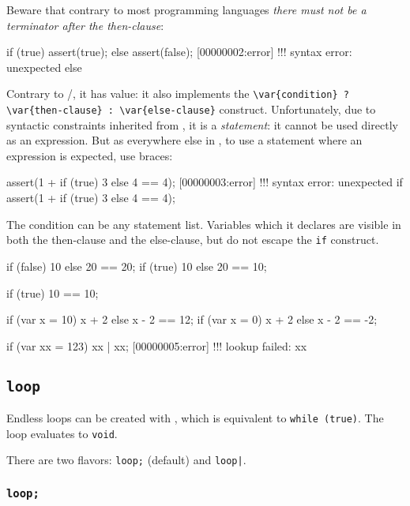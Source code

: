 Beware that contrary to most programming languages \emph{there must not be a
  terminator after the then-clause}:

\begin{urbiscript}
if (true)
  assert(true);
else
  assert(false);
[00000002:error] !!! syntax error: unexpected else
\end{urbiscript}

Contrary to \langC/\Cxx, it has value: it also implements the
\lstinline|\var{condition} ? \var{then-clause} : \var{else-clause}|
construct.  Unfortunately, due to syntactic constraints inherited from \langC,
it is a \emph{statement}: it cannot be used directly as an expression.  But
as everywhere else in \us, to use a statement where an expression is
expected, use braces:

\begin{urbiscript}
assert(1 + if (true) 3 else 4 == 4);
[00000003:error] !!! syntax error: unexpected if
assert(1 + { if (true) 3 else 4 } == 4);
\end{urbiscript}

The condition can be any statement list.  Variables which it declares are
visible in both the then-clause and the else-clause, but do not escape the
\lstinline{if} construct.

\begin{urbiassert}
{if (false) 10 else 20} == 20;
{if (true)  10 else 20} == 10;

{if (true) 10         } == 10;

{if (var x = 10) x + 2 else x - 2} == 12;
{if (var x = 0)  x + 2 else x - 2} == -2;

{if (var xx = 123) xx | xx};
[00000005:error] !!! lookup failed: xx
\end{urbiassert}


\subsection{\lstinline{loop}}
\label{sec:lang:loop}

Endless loops can be created with , which is equivalent to
\lstinline|while (true)|.  The loop evaluates to \lstinline{void}.


There are two flavors: \lstinline{loop;} (default) and \lstinline{loop|}.

\subsubsection{\lstinline{loop;}}
\label{sec:lang:loop:semi}

